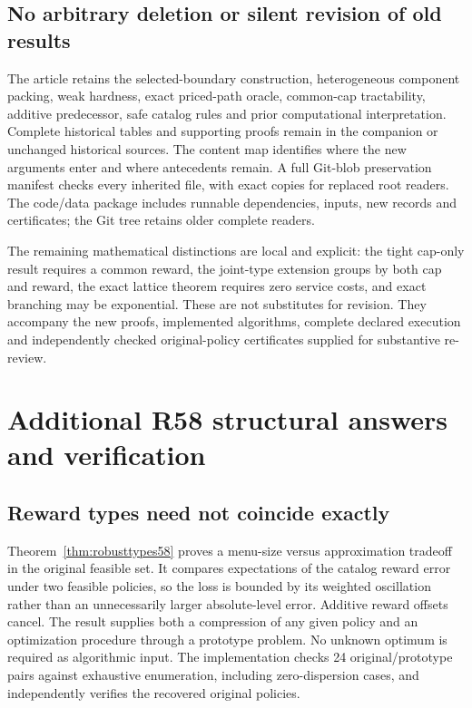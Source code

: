 \subsection{No arbitrary deletion or silent revision of old results}
The article retains the selected-boundary construction, heterogeneous component packing, weak hardness, exact priced-path oracle, common-cap tractability, additive predecessor, safe catalog rules and prior computational interpretation. Complete historical tables and supporting proofs remain in the companion or unchanged historical sources. The content map identifies where the new arguments enter and where antecedents remain. A full Git-blob preservation manifest checks every inherited file, with exact copies for replaced root readers. The code/data package includes runnable dependencies, inputs, new records and certificates; the Git tree retains older complete readers.

The remaining mathematical distinctions are local and explicit: the tight cap-only result requires a common reward, the joint-type extension groups by both cap and reward, the exact lattice theorem requires zero service costs, and exact branching may be exponential. These are not substitutes for revision. They accompany the new proofs, implemented algorithms, complete declared execution and independently checked original-policy certificates supplied for substantive re-review.

\section{Additional R58 structural answers and verification}
\subsection{Reward types need not coincide exactly}
Theorem~\ref{thm:robusttypes58} proves a menu-size versus approximation tradeoff in the original feasible set. It compares expectations of the catalog reward error under two feasible policies, so the loss is bounded by its weighted oscillation rather than an unnecessarily larger absolute-level error. Additive reward offsets cancel. The result supplies both a compression of any given policy and an optimization procedure through a prototype problem. No unknown optimum is required as algorithmic input. The implementation checks 24 original/prototype pairs against exhaustive enumeration, including zero-dispersion cases, and independently verifies the recovered original policies.

